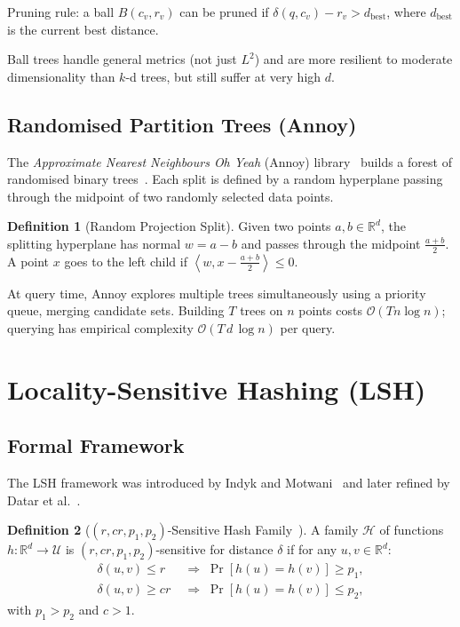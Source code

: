 \documentclass[11pt,a4paper]{article}
\theoremstyle{definition}
\newtheorem{definition}{Definition}[section]
\newcommand{\R}{\mathbb{R}}
\newcommand{\calO}{\mathcal{O}}
\newcommand{\inner}[2]{\left\langle #1, #2 \right\rangle}
\begin{document}
Pruning rule: a ball $B(c_v, r_v)$ can be pruned if
$\delta(q, c_v) - r_v > d_{\text{best}}$, where $d_{\text{best}}$ is
the current best distance.

Ball trees handle general metrics (not just $L^2$) and are more
resilient to moderate dimensionality than $k$-d trees, but still
suffer at very high $d$.

\subsection{Randomised Partition Trees (Annoy)}

The \emph{Approximate Nearest Neighbours Oh Yeah} (Annoy) library~\cite{bernhardsson2015annoy} builds
a forest of randomised binary trees~\cite{dasgupta2008random}.  Each split is defined by a random
hyperplane passing through the midpoint of two randomly selected data
points.

\begin{definition}[Random Projection Split]
Given two points $a, b \in \R^d$, the splitting hyperplane has normal
$w = a - b$ and passes through the midpoint $\frac{a+b}{2}$.  A point
$x$ goes to the left child if $\inner{w}{x - \frac{a+b}{2}} \leq 0$.
\end{definition}

At query time, Annoy explores multiple trees simultaneously using a
priority queue, merging candidate sets.  Building $T$ trees on $n$
points costs $\calO(Tn\log n)$; querying has empirical complexity
$\calO(T\,d\,\log n)$ per query.


\section{Locality-Sensitive Hashing (LSH)}\label{sec:lsh}

\subsection{Formal Framework}

The LSH framework was introduced by Indyk and Motwani~\cite{indyk1998lsh}
and later refined by Datar et al.~\cite{datar2004e2lsh}.

\begin{definition}[$(r, cr, p_1, p_2)$-Sensitive Hash Family~\cite{indyk1998lsh}]
A family $\mathcal{H}$ of functions $h: \R^d \to \mathcal{U}$ is
$(r, cr, p_1, p_2)$-sensitive for distance $\delta$ if for any
$u, v \in \R^d$:
\begin{align}
  \delta(u,v) \leq r   &\;\Longrightarrow\; \Pr[h(u) = h(v)] \geq p_1, \\
  \delta(u,v) \geq cr  &\;\Longrightarrow\; \Pr[h(u) = h(v)] \leq p_2,
\end{align}
with $p_1 > p_2$ and $c > 1$.
\end{definition}
\end{document}
